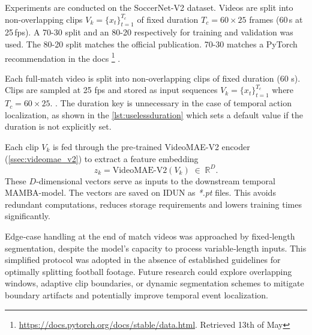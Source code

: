 Experiments are conducted on the SoccerNet-V2 dataset\cite{deliege_soccernet-v2_dataset_2021}. Videos are split into non-overlapping clips $V_k=\{x_t\}_{t=1}^{T_c}$ of fixed duration $T_c=60\!\times\!25$ frames (60\,s at 25\,fps). A 70-30 split and an 80-20 respectively for training and validation was used. The 80-20 split matches the official publication. 70-30 matches a PyTorch recommendation in the docs
\footnote{
\url{https://docs.pytorch.org/docs/stable/data.html}. 
Retrieved 13th of May}
.






Each full‐match video is split into non‐overlapping clips of fixed duration (60 s). Clips are sampled at 25 fps and stored as input sequences $V_k=\{x_t\}_{t=1}^{T_c}$ where $T_c=60\times25$. . The duration key is unnecessary in the case of temporal action localization, as shown in the \autoref{lst:uselessduration} which sets a default value if the duration is not explicitly set. 



Each clip $V_k$ is fed through the pre‐trained VideoMAE-V2 encoder (\autoref{ssec:videomae_v2}) to extract a feature embedding
\[
z_k = \mathrm{VideoMAE\text{-}V2}(V_k)\;\in\;\mathbb{R}^D.
\]
These $D$‐dimensional vectors serve as inputs to the downstream  temporal MAMBA-model. The vectors are saved on IDUN as \textit{*.pt} files. This avoids redundant computations, reduces storage requirements and lowers training times significantly. 

Edge‐case handling at the end of match videos was approached by fixed‐length segmentation, despite the model's capacity to process variable‐length inputs. This simplified protocol was adopted in the absence of established guidelines for optimally splitting football footage.  Future research could explore overlapping windows, adaptive clip boundaries, or dynamic segmentation schemes to mitigate boundary artifacts and potentially improve temporal event localization. 

